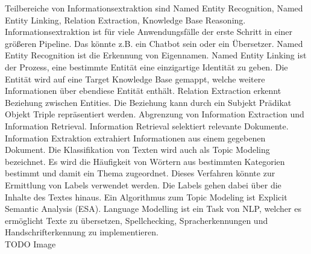 Teilbereiche von Informationsextraktion sind Named Entity Recognition, Named Entity Linking, Relation Extraction, Knowledge Base Reasoning.
Informationsextraktion ist für viele Anwendungsfälle der erste Schritt in einer größeren Pipeline.
Das könnte z.B.
ein Chatbot sein oder ein Übersetzer.
Named Entity Recognition ist die Erkennung von Eigennamen.
Named Entity Linking ist der Prozess, eine bestimmte Entität eine einzigartige Identität zu geben.
Die Entität wird auf eine Target Knowledge Base gemappt, welche weitere Informationen über ebendiese Entität enthält.
Relation Extraction erkennt Beziehung zwischen Entities.
Die Beziehung kann durch ein Subjekt Prädikat Objekt Triple repräsentiert werden.
Abgrenzung von Information Extraction und Information Retrieval.
Information Retrieval selektiert relevante Dokumente.
Information Extraktion extrahiert Informationen aus einem gegebenen Dokument.
Die Klassifikation von Texten wird auch als Topic Modeling bezeichnet.
Es wird die Häufigkeit von Wörtern aus bestimmten Kategorien bestimmt und damit ein Thema zugeordnet.
Dieses Verfahren könnte zur Ermittlung von Labels verwendet werden.
Die Labels gehen dabei über die Inhalte des Textes hinaus.
Ein Algorithmus zum Topic Modeling ist Explicit Semantic Analysis (ESA).
Language Modelling ist ein Task von NLP, welcher es ermöglicht Texte zu übersetzen, Spellchecking, Spracherkennungen und Handschrifterkennung zu implementieren.\\

TODO Image